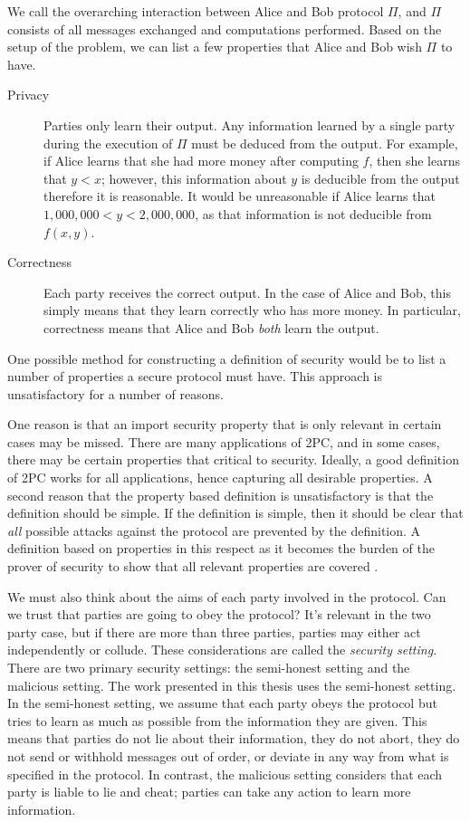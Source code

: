 We call the overarching interaction between Alice and Bob protocol $\Pi$, and $\Pi$ consists of all messages exchanged and computations performed.
Based on the setup of the problem, we can list a few properties that Alice and Bob wish $\Pi$ to have.
\begin{description}
    \item[Privacy] 
        Parties only learn their output. 
        Any information learned by a single party during the execution of $\Pi$ must be deduced from the output. 
        For example, if Alice learns that she had more money after computing $f$, then she learns that $y < x$; however, this information about $y$ is deducible from the output therefore it is reasonable.
        It would be unreasonable if Alice learns that $1,000,000 < y < 2,000,000$, as that information is not deducible from $f(x,y)$.
    \item[Correctness] 
        Each party receives the correct output.
        In the case of Alice and Bob, this simply means that they learn correctly who has more money.
        In particular, correctness means that Alice and Bob \textit{both} learn the output.

\end{description}

One possible method for constructing a definition of security would be to list a number of properties a secure protocol must have.
This approach is unsatisfactory for a number of reasons.

One reason is that an import security property that is only relevant in certain cases may be missed.
There are many applications of 2PC, and in some cases, there may be certain properties that critical to security.
Ideally, a good definition of 2PC works for all applications, hence capturing all desirable properties.
A second reason that the property based definition is unsatisfactory is that the definition should be simple.
If the definition is simple, then it should be clear that \textit{all} possible attacks against the protocol are prevented by the definition.
A definition based on properties in this respect as it becomes the burden of the prover of security to show that all relevant properties are covered \cite{lindell2009secure}.

We must also think about the aims of each party involved in the protocol. 
Can we trust that parties are going to obey the protocol? 
It's relevant in the two party case, but if there are more than three parties, parties may either act independently or collude. 
These considerations are called the \textit{security setting}.
There are two primary security settings: the semi-honest setting and the malicious setting. 
The work presented in this thesis uses the semi-honest setting. 
In the semi-honest setting, we assume that each party obeys the protocol but tries to learn as much as possible from the information they are given.
This means that parties do not lie about their information, they do not abort, they do not send or withhold messages out of order, or deviate in any way from what is specified in the protocol. 
In contrast, the malicious setting considers that each party is liable to lie and cheat; parties can take any action to learn more information.

